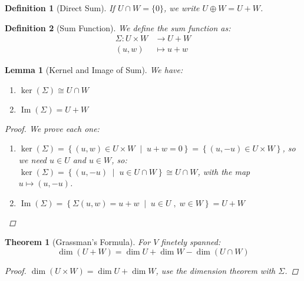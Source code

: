 \documentclass[12pt]{article}
\newcommand{\set}[2]{\left\{{#1}\;\middle|\;{#2}\right\}}
\DeclareMathOperator{\Image}{Im}
\newtheorem{theorem}{Theorem}[subsection]
\newtheorem{definition}{Definition}[subsection]
\newtheorem{lemma}{Lemma}[subsection]
\begin{document}
\begin{definition}[Direct Sum]
  If $U\cap W=\{0\}$, we write $U\oplus W=U+W$.
\end{definition}

\begin{definition}[Sum Function]
  We define the sum function as:
  \begin{align*}
    \Sigma: U \times W&\to U+W\\
    (u,w)&\mapsto u+w
  \end{align*}
\end{definition}

\begin{lemma}[Kernel and Image of Sum]
  We have:
  \begin{enumerate}
    \item $\ker(\Sigma)\cong U\cap W$
    \item $\Image(\Sigma)=U+W$
  \end{enumerate}
  \begin{proof}
    We prove each one:
    \begin{enumerate}
      \item $\ker(\Sigma)= \set{(u,w)\in U\times W}{u+w=0}=\left\{(u,-u)\in U\times W\right\}$, so we need $u\in U$ and $u\in W$, so: $\ker(\Sigma)=\set{(u,-u)}{u\in U\cap W}\cong U\cap W$, with the map $u\mapsto (u,-u)$.
      \item $\Image(\Sigma)=\set{\Sigma(u,w)=u+w}{u\in U\;,\;w\in W}=U+W$
    \end{enumerate}
  \end{proof}
\end{lemma}

\begin{theorem}[Grassman's Formula]
  For $V$ finetely spanned:
  $$\dim(U+W)=\dim U+\dim W-\dim(U\cap W)$$
  \begin{proof}
    $\dim(U\times W)=\dim U+\dim W$, use the dimension theorem with $\Sigma$.
  \end{proof}
\end{theorem}
\end{document}
